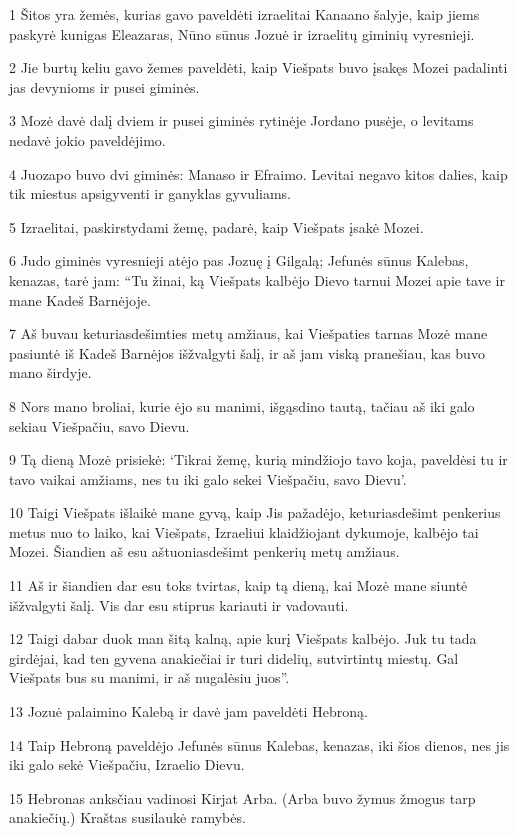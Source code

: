 \par 1 Šitos yra žemės, kurias gavo paveldėti izraelitai Kanaano šalyje, kaip jiems paskyrė kunigas Eleazaras, Nūno sūnus Jozuė ir izraelitų giminių vyresnieji. 
\par 2 Jie burtų keliu gavo žemes paveldėti, kaip Viešpats buvo įsakęs Mozei padalinti jas devynioms ir pusei giminės. 
\par 3 Mozė davė dalį dviem ir pusei giminės rytinėje Jordano pusėje, o levitams nedavė jokio paveldėjimo. 
\par 4 Juozapo buvo dvi giminės: Manaso ir Efraimo. Levitai negavo kitos dalies, kaip tik miestus apsigyventi ir ganyklas gyvuliams. 
\par 5 Izraelitai, paskirstydami žemę, padarė, kaip Viešpats įsakė Mozei. 
\par 6 Judo giminės vyresnieji atėjo pas Jozuę į Gilgalą; Jefunės sūnus Kalebas, kenazas, tarė jam: “Tu žinai, ką Viešpats kalbėjo Dievo tarnui Mozei apie tave ir mane Kadeš Barnėjoje. 
\par 7 Aš buvau keturiasdešimties metų amžiaus, kai Viešpaties tarnas Mozė mane pasiuntė iš Kadeš Barnėjos išžvalgyti šalį, ir aš jam viską pranešiau, kas buvo mano širdyje. 
\par 8 Nors mano broliai, kurie ėjo su manimi, išgąsdino tautą, tačiau aš iki galo sekiau Viešpačiu, savo Dievu. 
\par 9 Tą dieną Mozė prisiekė: ‘Tikrai žemę, kurią mindžiojo tavo koja, paveldėsi tu ir tavo vaikai amžiams, nes tu iki galo sekei Viešpačiu, savo Dievu’. 
\par 10 Taigi Viešpats išlaikė mane gyvą, kaip Jis pažadėjo, keturiasdešimt penkerius metus nuo to laiko, kai Viešpats, Izraeliui klaidžiojant dykumoje, kalbėjo tai Mozei. Šiandien aš esu aštuoniasdešimt penkerių metų amžiaus. 
\par 11 Aš ir šiandien dar esu toks tvirtas, kaip tą dieną, kai Mozė mane siuntė išžvalgyti šalį. Vis dar esu stiprus kariauti ir vadovauti. 
\par 12 Taigi dabar duok man šitą kalną, apie kurį Viešpats kalbėjo. Juk tu tada girdėjai, kad ten gyvena anakiečiai ir turi didelių, sutvirtintų miestų. Gal Viešpats bus su manimi, ir aš nugalėsiu juos”. 
\par 13 Jozuė palaimino Kalebą ir davė jam paveldėti Hebroną. 
\par 14 Taip Hebroną paveldėjo Jefunės sūnus Kalebas, kenazas, iki šios dienos, nes jis iki galo sekė Viešpačiu, Izraelio Dievu. 
\par 15 Hebronas anksčiau vadinosi Kirjat Arba. (Arba buvo žymus žmogus tarp anakiečių.) Kraštas susilaukė ramybės.



